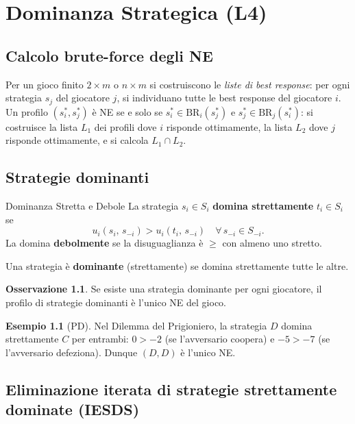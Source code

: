 \documentclass[12pt,a4paper,twoside]{book}
\theoremstyle{plain}
\theoremstyle{definition}
\newtheorem{example}[theorem]{Esempio}
\newtheorem{remark}[theorem]{Osservazione}
\newcommand{\BR}{\mathrm{BR}}
\begin{document}
\chapter{Dominanza Strategica (L4)}

\section{Calcolo brute-force degli NE}

Per un gioco finito $2\times m$ o $n\times m$ si costruiscono le \emph{liste di best response}: per ogni strategia $s_j$ del giocatore $j$, si individuano tutte le best response del giocatore $i$. Un profilo $(s_i^*,s_j^*)$ è NE se e solo se $s_i^*\in\BR_i(s_j^*)$ e $s_j^*\in\BR_j(s_i^*)$: si costruisce la lista $L_1$ dei profili dove $i$ risponde ottimamente, la lista $L_2$ dove $j$ risponde ottimamente, e si calcola $L_1\cap L_2$.

\section{Strategie dominanti}

\begin{defbox}{Dominanza Stretta e Debole}
La strategia $s_i\in S_i$ \textbf{domina strettamente} $t_i\in S_i$ se
\[
  u_i(s_i,\, s_{-i}) > u_i(t_i,\, s_{-i})\quad \forall\,s_{-i}\in S_{-i}.
\]
La domina \textbf{debolmente} se la disuguaglianza è $\ge$ con almeno uno stretto.

Una strategia è \textbf{dominante} (strettamente) se domina strettamente tutte le altre.
\end{defbox}

\begin{remark}
Se esiste una strategia dominante per ogni giocatore, il profilo di strategie dominanti è l'unico NE del gioco.
\end{remark}

\begin{example}[PD]
Nel Dilemma del Prigioniero, la strategia $D$ domina strettamente $C$ per entrambi: $0>-2$ (se l'avversario coopera) e $-5>-7$ (se l'avversario defeziona). Dunque $(D,D)$ è l'unico NE.
\end{example}

\section{Eliminazione iterata di strategie strettamente dominate (IESDS)}
\end{document}
